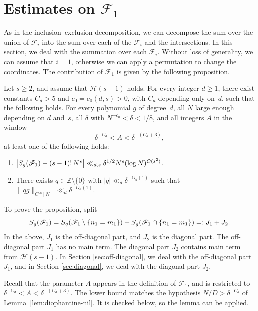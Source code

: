 \section{\texorpdfstring{Estimates on $\mathscr{F}_1$}{Estimates on F_1}}
\label{sec:F1}

As in the inclusion--exclusion decomposition, we can decompose the sum
over the union of $\mathscr{F}_i$ into the sum over each of the $\mathscr{F}_i$ and the intersections.
In this section, we deal with the summation over each $\mathscr{F}_i$.
Without loss of generality, we can assume that $i=1$, otherwise we  can apply a permutation 
to change the coordinates.
The contribution of \(\mathscr{F}_1\) is given by the following proposition.
\begin{proposition}\label{prop:F1}
Let $s\geq 2$, and assume that $\mathcal{H}(s-1)$ holds.
For every integer $d\geq 1$, there exist constants $C_d>5$ and $c_0=c_0(d,s)>0$, with $C_d$ depending only on~$d$, such that the following holds.
For every polynomial $g$ of degree~$d$, all
$N$ large enough depending on $d$ and~$s$, all $\delta$ with $N^{-c_0}<\delta<1/8$,
and all integers $A$ in the window
\[
\delta^{-C_d}<A<\delta^{-(C_d+3)},
\]
at least one of the following holds:
\begin{enumerate}
    \item $\big|S_g\!\left(\mathscr{F}_1\right)-(s-1)!\,N^s\big|\ll_{d,s} \delta^{1/2} N^s (\log N)^{O(s^2)}$.
    \item There exists $q\in\mathbb{Z}\setminus\{0\}$ with $|q|\ll_d\delta^{-O_d(1)}$ such that $\|qg\|_{C^\infty[N]}\ll_d\delta^{-O_d(1)}$.
\end{enumerate}
\end{proposition}

To prove the proposition, split
\[
S_g\!\left(\mathscr{F}_1\right)
=S_g\!\left(\mathscr{F}_1\setminus\{n_1=m_1\}\right)
+S_g\!\left(\mathscr{F}_1\cap\{n_1=m_1\}\right)
=:J_1+J_2.
\]
In the above, $J_1$ is the off-diagonal part, and $J_2$ is the diagonal part.
The off-diagonal part \(J_1\) has no main term.
The diagonal part \(J_2\) contains main term from
\(\mathcal{H}(s-1)\).
In Section \ref{sec:off-diagonal}, we deal with the off-diagonal part $J_1$, and in Section \ref{sec:diagonal}, we deal with the diagonal part $J_2$.

Recall that the parameter $A$ appears in the definition of $\mathscr{F}_1$, and is restricted to $\delta^{-C_d}<A<\delta^{-(C_d+3)}$. The lower bound matches the hypothesis $N/D>\delta^{-C_d}$ of Lemma~\ref{lem:diophantine-nil}. It is checked below, so the lemma can be applied.


